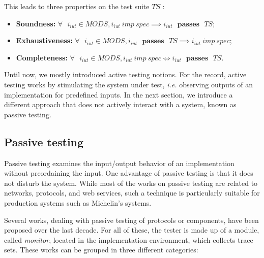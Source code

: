 This leads to three properties on the test suite $TS$
\cite{tretmans1996conformance}:

\begin{itemize}
\item \textbf{Soundness:} $\forall \text{ } i_{iut} \in MODS, i_{iut}
~imp~ spec \implies i_{iut} \text{ } \mathbf{passes} \text{ }
TS$;

\item \textbf{Exhaustiveness:} $\forall \text{ } i_{iut} \in MODS,
i_{iut} \text{ } \mathbf{passes} \text{ } TS \implies i_{iut} ~imp~
spec$;

\item \textbf{Completeness:} $\forall \text{ } i_{iut} \in MODS, i_{iut}
~imp~ spec \Leftrightarrow i_{iut} \text{ } \mathbf{passes}
\text{ } TS$.
\end{itemize}

Until now, we mostly introduced active testing notions. For the
record, active testing works by stimulating the system under
test, \emph{i.e.} observing outputs of an implementation for
predefined inputs. In the next section, we introduce a different
approach that does not actively interact with a system, known as
passive testing.

\subsection{Passive testing}
\label{sec:related:testing:active-passive}

Passive testing examines the input/output behavior of an
implementation without preordaining the input. One advantage of
passive testing is that it does not disturb the system. While
most of the works on passive testing are related to networks,
protocols, and web services, such a technique is particularly
suitable for production systems such as Michelin's systems.

Several works, dealing with passive testing of protocols or
components, have been proposed over the last decade. For all of
these, the tester is made up of a module, called \emph{monitor},
located in the implementation environment, which collects trace
sets. These works can be grouped in three different categories:

